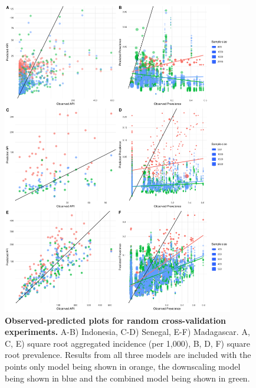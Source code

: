 \documentclass[10pt,letterpaper]{article}
\begin{document}
\begin{figure}[!h]
\includegraphics[width = 0.9\textwidth]{figures/random_cv_scatter.pdf} %
\caption{{\bf Observed-predicted plots for random cross-validation experiments.}
A-B) Indonesia, C-D) Senegal, E-F) Madagascar. A, C, E) square root aggregated incidence (per 1,000), B, D, F) square root prevalence.
Results from all three models are included with the points only model being shown in orange, the downscaling model being shown in blue and the combined model being shown in green.
}
\label{predobsscatter}
\end{figure}
\end{document}
